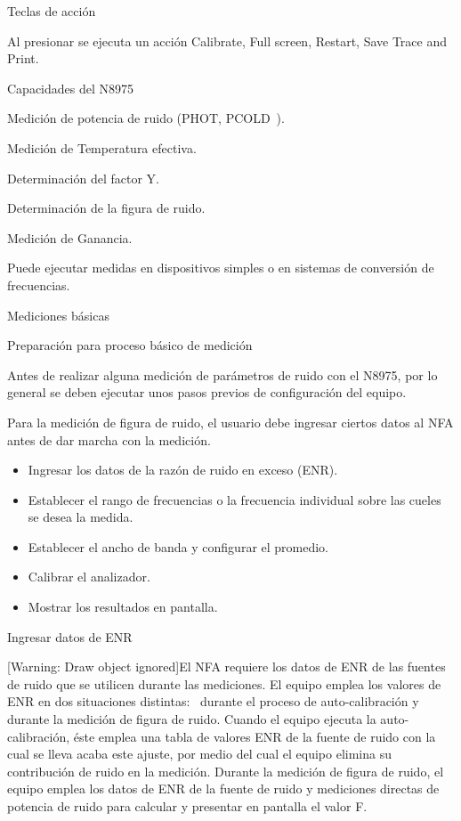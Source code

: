	Teclas de acción
	
	Al presionar se ejecuta un acción Calibrate, Full screen, Restart, Save Trace and Print.
	
	Capacidades del N8975
	
	Medición de potencia de ruido (PHOT, PCOLD~).
	
	Medición de Temperatura efectiva.
	
	Determinación del factor Y.
	
	Determinación de la figura de ruido.
	
	Medición de Ganancia.
	
	Puede ejecutar medidas en dispositivos simples o en sistemas de conversión de frecuencias.
	
	Mediciones básicas
	
	Preparación para proceso básico de medición
	
	Antes de realizar alguna medición de parámetros de ruido con el N8975, por lo general se deben ejecutar unos pasos
	previos de configuración del equipo.
	
	Para la medición de figura de ruido, el usuario debe ingresar ciertos datos al NFA antes de dar marcha con la medición.
	
	\begin{itemize}
		\item Ingresar los datos de la razón de ruido en exceso (ENR).
		\item Establecer el rango de frecuencias o la frecuencia individual sobre las cueles se desea la medida.
		\item Establecer el ancho de banda y configurar el promedio.
		\item Calibrar el analizador.
		\item Mostrar los resultados en pantalla.
	\end{itemize}

	Ingresar datos de ENR
	
	[Warning: Draw object ignored]El NFA requiere los datos de ENR de las fuentes de ruido que se utilicen durante las
	mediciones. El equipo emplea los valores de ENR en dos situaciones distintas: \ durante el proceso de auto-calibración
	y durante la medición de figura de ruido. Cuando el equipo ejecuta la auto-calibración, éste emplea una tabla de
	valores ENR de la fuente de ruido con la cual se lleva acaba este ajuste, por medio del cual el equipo elimina su
	contribución de ruido en la medición. Durante la medición de figura de ruido, el equipo emplea los datos de ENR de la
	fuente de ruido y mediciones directas de potencia de ruido para calcular y presentar en pantalla el valor F. 
	
